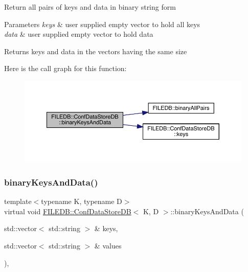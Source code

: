 Return all pairs of keys and data in binary string form 
\begin{DoxyParams}{Parameters}
{\em keys} & user supplied empty vector to hold all keys \\
\hline
{\em data} & user supplied empty vector to hold data \\
\hline
\end{DoxyParams}
\begin{DoxyReturn}{Returns}
keys and data in the vectors having the same size 
\end{DoxyReturn}
Here is the call graph for this function\+:
\nopagebreak
\begin{figure}[H]
\begin{center}
\leavevmode
\includegraphics[width=350pt]{d8/d19/classFILEDB_1_1ConfDataStoreDB_ae38beaf9ba3f8629f2c322a3c5a23357_cgraph}
\end{center}
\end{figure}
\mbox{\label{classFILEDB_1_1ConfDataStoreDB_ae38beaf9ba3f8629f2c322a3c5a23357}} 
\subsubsection{\texorpdfstring{binaryKeysAndData()}{binaryKeysAndData()}\hspace{0.1cm}{\footnotesize\ttfamily [2/3]}}
{\footnotesize\ttfamily template$<$typename K, typename D$>$ \\
virtual void \mbox{\hyperlink{classFILEDB_1_1ConfDataStoreDB}{F\+I\+L\+E\+D\+B\+::\+Conf\+Data\+Store\+DB}}$<$ K, D $>$\+::binary\+Keys\+And\+Data (\begin{DoxyParamCaption}\item[{std\+::vector$<$ std\+::string $>$ \&}]{keys,  }\item[{std\+::vector$<$ std\+::string $>$ \&}]{values }\end{DoxyParamCaption})\hspace{0.3cm}{\ttfamily [inline]}, {\ttfamily [virtual]}}


